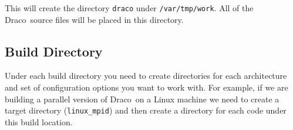 \documentclass[11pt]{nmemo}
\newcommand{\comp}[1]{\normalfont\footnotesize\texttt{#1}\normalsize}
\newcommand{\draco}{{\normalfont\sffamily Draco}}
\newcommand{\metis}{{\normalfont\sffamily Metis}}
\newcommand{\svn}{{\normalfont\bfseries SVN}}
\begin{document}
This will create the directory \comp{draco} under \comp{/var/tmp/work}.  All
of the \draco\ source files will be placed in this directory.  

%

%
%
%
%
%
%

\subsection{Build Directory}
\label{builddir}

Under each build directory you need to create directories for each
architecture and set of configuration options you want to work with.
For example, if we are building a parallel version of \draco\ on a
Linux machine we need to create a target directory (\comp{linux\_mpid})
and then create a directory for each code under this build location.
\end{document}
